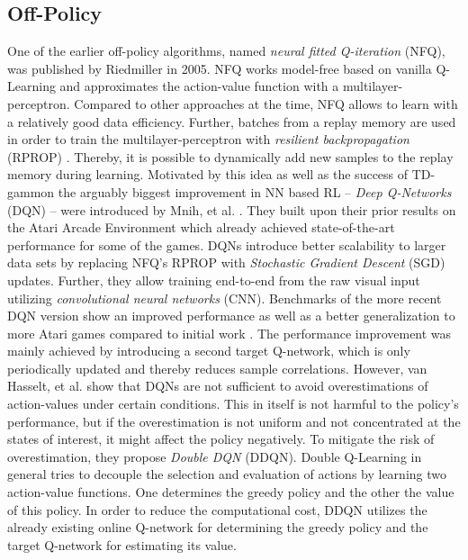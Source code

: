  	\subsection{Off-Policy \label{sec:off-policy}}
	One of the earlier off-policy algorithms, named \textit{neural fitted Q-iteration} (NFQ), was published by Riedmiller \cite{Riedmiller2005} in 2005. 
	NFQ works model-free based on vanilla Q-Learning \cite{Watkins1989} and approximates the action-value function with a multilayer-perceptron.
	Compared to other approaches at the time, NFQ allows to learn with a relatively good data efficiency.
	Further, batches from a replay memory \cite{Lin1992} are used in order to train the multilayer-perceptron with \textit{resilient backpropagation} (RPROP) \cite{Riedmiller1993}.
	Thereby, it is possible to dynamically add new samples to the replay memory during learning.
	Motivated by this idea as well as the success of TD-gammon \cite{Tesauro1994} the arguably biggest improvement in NN based RL -- \textit{Deep Q-Networks} (DQN) -- were introduced by Mnih, et al. \cite{Mnih2015}.   
	They built upon their prior results \cite{Mnih2013} on the Atari Arcade Environment \cite{Bellemare2013} which already achieved state-of-the-art performance for some of the games.
	DQNs introduce better scalability to larger data sets by replacing NFQ's RPROP with \textit{Stochastic Gradient Descent} (SGD) updates. 
	Further, they allow training end-to-end from the raw visual input utilizing \textit{convolutional neural networks} (CNN). 
	Benchmarks of the more recent DQN version \cite{Mnih2015} show an improved performance as well as a better generalization to more Atari games compared to initial work \cite{Mnih2013}.
	The performance improvement was mainly achieved by introducing a second target Q-network, which is only periodically updated and thereby reduces sample correlations. 
	However, van Hasselt, et al. \cite{VanHasselt2016} show that DQNs \cite{Mnih2015} are not sufficient to avoid overestimations of action-values under certain conditions. 
	This in itself is not harmful to the policy's performance, but if the overestimation is not uniform and not concentrated at the states of interest, it might affect the policy negatively. 
	To mitigate the risk of overestimation, they propose \textit{Double DQN} (DDQN).
	Double Q-Learning in general tries to decouple the selection and evaluation of actions by learning two action-value functions. 
	One determines the greedy policy and the other the value of this policy.  
	In order to reduce the computational cost, DDQN utilizes the already existing online Q-network for determining the greedy policy and the target Q-network for estimating its value. 
